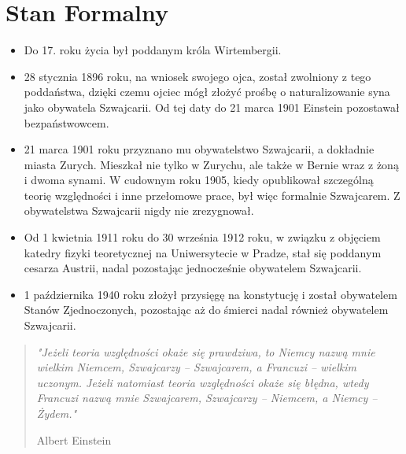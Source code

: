 \documentclass[11pt]{article}
\begin{document}
\section{Stan Formalny}
\begin{itemize}
\item Do 17. roku życia był poddanym króla Wirtembergii.
\item 28 stycznia 1896 roku, na wniosek swojego ojca, został zwolniony z tego poddaństwa, dzięki czemu ojciec mógł złożyć prośbę o naturalizowanie syna jako obywatela Szwajcarii. Od tej daty do 21 marca 1901 Einstein pozostawał bezpaństwowcem.
\item 21 marca 1901 roku przyznano mu obywatelstwo Szwajcarii, a dokładnie miasta Zurych. Mieszkał nie tylko w Zurychu, ale także w Bernie wraz z żoną i dwoma synami. W cudownym roku 1905, kiedy opublikował szczególną teorię względności i inne przełomowe prace, był więc formalnie Szwajcarem. Z obywatelstwa Szwajcarii nigdy nie zrezygnował.
\item Od 1 kwietnia 1911 roku do 30 września 1912 roku, w związku z objęciem katedry fizyki teoretycznej na Uniwersytecie w Pradze, stał się poddanym cesarza Austrii, nadal pozostając jednocześnie obywatelem Szwajcarii.
\item 1 października 1940 roku złożył przysięgę na konstytucję i został obywatelem Stanów Zjednoczonych, pozostając aż do śmierci nadal również obywatelem Szwajcarii.
\end{itemize}
\vspace{1.2cm}
\begin{quotation}
\textit{"Jeżeli teoria względności okaże się prawdziwa, to Niemcy nazwą mnie wielkim Niemcem, Szwajcarzy – Szwajcarem, a Francuzi – wielkim uczonym. Jeżeli natomiast teoria względności okaże się błędna, wtedy Francuzi nazwą mnie Szwajcarem, Szwajcarzy – Niemcem, a Niemcy – Żydem."}\\
\begin{flushright}
Albert Einstein
\end{flushright}
\end{quotation}
\newpage
\end{document}
